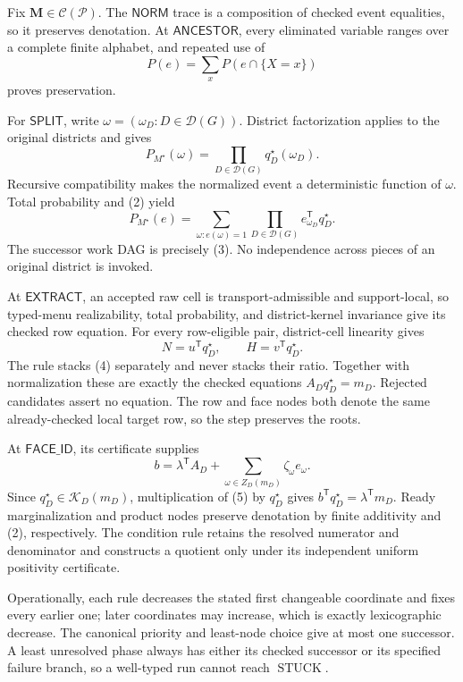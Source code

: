 Fix \(\mathbf M\in\mathcal C(\mathcal P)\).  The \(\mathsf{NORM}\) trace is a composition of checked event equalities, so it preserves denotation.  At \(\mathsf{ANCESTOR}\), every eliminated variable ranges over a complete finite alphabet, and repeated use of
\[
P(e)=\sum_xP(e\cap\{X=x\})
\tag{1}
\]
proves preservation.

For \(\mathsf{SPLIT}\), write \(\omega=(\omega_D:D\in\mathcal D(G))\).  District factorization applies to the original districts and gives
\[
P_{M^\star}(\omega)=\prod_{D\in\mathcal D(G)}q_D^\star(\omega_D).
\tag{2}
\]
Recursive compatibility makes the normalized event a deterministic function of \(\omega\).  Total probability and (2) yield
\[
P_{M^\star}(e)=
\sum_{\omega:e(\omega)=1}
\prod_{D\in\mathcal D(G)}e_{\omega_D}^{\mathsf T}q_D^\star.
\tag{3}
\]
The successor work DAG is precisely (3).  No independence across pieces of an original district is invoked.

At \(\mathsf{EXTRACT}\), an accepted raw cell is transport-admissible and support-local, so typed-menu realizability, total probability, and district-kernel invariance give its checked row equation.  For every row-eligible pair, district-cell linearity gives
\[
N=u^{\mathsf T}q_D^\star,
\qquad H=v^{\mathsf T}q_D^\star.
\tag{4}
\]
The rule stacks (4) separately and never stacks their ratio.  Together with normalization these are exactly the checked equations \(A_Dq_D^\star=m_D\).  Rejected candidates assert no equation.  The row and face nodes both denote the same already-checked local target row, so the step preserves the roots.

At \(\mathsf{FACE\_ID}\), its certificate supplies
\[
b=\lambda^{\mathsf T}A_D+
\sum_{\omega\in Z_D(m_D)}\zeta_\omega e_\omega.
\tag{5}
\]
Since \(q_D^\star\in\mathcal K_D(m_D)\), multiplication of (5) by \(q_D^\star\) gives \(b^{\mathsf T}q_D^\star=\lambda^{\mathsf T}m_D\).  Ready marginalization and product nodes preserve denotation by finite additivity and (2), respectively.  The condition rule retains the resolved numerator and denominator and constructs a quotient only under its independent uniform positivity certificate.

Operationally, each rule decreases the stated first changeable coordinate and fixes every earlier one; later coordinates may increase, which is exactly lexicographic decrease.  The canonical priority and least-node choice give at most one successor.  A least unresolved phase always has either its checked successor or its specified failure branch, so a well-typed run cannot reach \(\operatorname{STUCK}\).